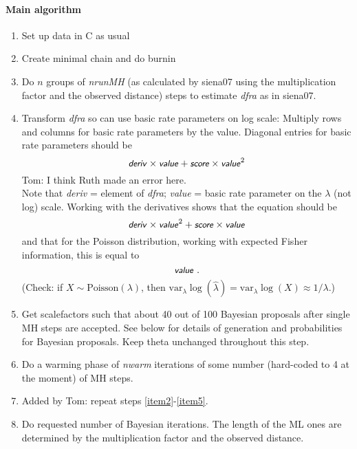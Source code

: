 \documentclass[12pt,a4paper]{article}
\renewcommand{\=}{\,=\,}
\newcommand{\+}{\,+\,}
\newcommand{\nnm}[1]{\textsf{\small\textit{#1}}}
\begin{document}
\paragraph{Main algorithm}
\begin{enumerate}
  \item Set up data in C as usual
  \item Create minimal chain and do burnin
  \item Do $n$ groups of \nnm{nrunMH} (as calculated by siena07 using the
    multiplication factor and the observed distance) steps to
  estimate \nnm{dfra} as in siena07. \label{item2}
  \item Transform \nnm{dfra} so can use basic rate parameters on log scale:
Multiply rows and columns for basic rate parameters by the value. Diagonal
entries for basic rate parameters should be
$$ \nnm{deriv} \times \nnm{value} + \nnm{score} \times \nnm{value}^2 $$
Tom: I think Ruth made an error here.\\
Note that \nnm{deriv} = element of \nnm{dfra}; \nnm{value} = basic rate parameter
on the $\lambda$ (not log) scale.
 Working with the derivatives shows that the equation should be
$$ \nnm{deriv} \times \nnm{value}^2 + \nnm{score} \times \nnm{value} $$
and that for the Poisson distribution, working with expected Fisher information,
this is equal to
$$  \nnm{value} \ . $$
(Check: if $X \sim \textrm{Poisson}(\lambda)$, then $\text{var}_\lambda \log(\hat\lambda)
=\text{var}_\lambda \log(X) \approx 1/\lambda $.)

  \item Get scalefactors such that about 40 out of 100 Bayesian proposals
      after single MH steps are accepted. See below for details of
      generation and probabilities for Bayesian proposals. Keep theta
      unchanged throughout this step. \label{item5}
\item Do a warming phase of \nnm{nwarm} iterations of some number (hard-coded to
  4 at the moment) of MH steps.
\item Added by Tom: repeat steps \ref{item2}-\ref{item5}.
\item Do requested number of Bayesian iterations. The
  length of the ML ones are determined by the multiplication factor and the
  observed distance.
\end{enumerate}
\end{document}
